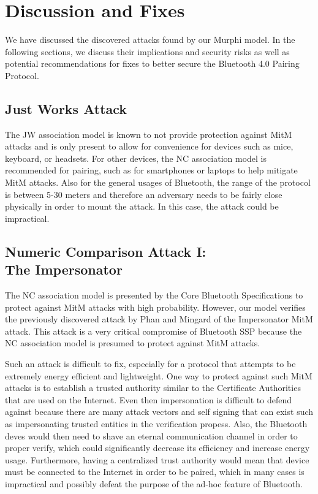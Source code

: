\documentclass{acm_proc_article-sp}
\begin{document}
\section{Discussion and Fixes}
We have discussed the discovered attacks found by our Murphi model. In the following sections, we discuss their implications and security risks as well as potential recommendations for fixes to better secure the Bluetooth 4.0 Pairing Protocol.

\subsection{Just Works Attack}
The JW association model is known to not provide protection against MitM attacks and is only present to allow for convenience for devices such as mice, keyboard, or headsets. For other devices, the NC association model is recommended for pairing, such as for smartphones or laptops to help mitigate MitM attacks. Also for the general usages of Bluetooth, the range of the protocol is between 5-30 meters and therefore an adversary needs to be fairly close physically in order to mount the attack. In this case, the attack could be impractical.

\subsection{Numeric Comparison Attack I:\\The Impersonator}
The NC association model is presented by the Core Bluetooth Specifications \cite{bluetooth:sig4} to protect against MitM attacks with high probability. However, our model verifies the previously discovered attack by Phan and Mingard \cite{phan:mingard} of the Impersonator MitM attack. This attack is a very critical compromise of Bluetooth SSP because the NC association model is presumed to protect against MitM attacks.

Such an attack is difficult to fix, especially for a protocol that attempts to be extremely energy efficient and lightweight. One way to protect against such MitM attacks is to establish a trusted authority similar to the Certificate Authorities that are used on the Internet. Even then impersonation is difficult to defend against because there are many attack vectors and self signing that can exist such as impersonating trusted entities in the verification propess. Also, the Bluetooth deves would then need to shave an eternal communication channel in order to proper verify, which could significantly decrease its efficiency and increase energy usage. Furthermore, having a centralized trust authority would mean that device must be connected to the Internet in order to be paired, which in many cases is impractical and possibly defeat the purpose of the ad-hoc feature of Bluetooth.
\end{document}
